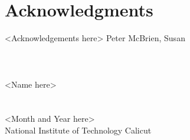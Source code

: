 \cleardoublepage
{}
{}
\chapter*{Acknowledgments}
\vspace{1.0in}
<Acknowledgements here>
Peter McBrien, Susan
\\
\\
\\
\\
<Name here> \\
\\
\\
<Month and Year here>\\
{National Institute of Technology Calicut}\\
\newpage
